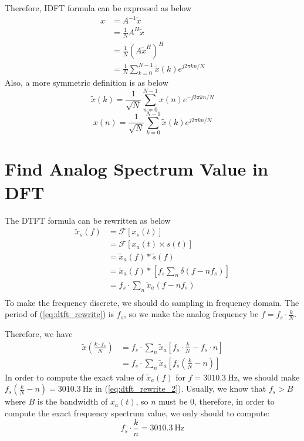 \documentclass{article}
\begin{document}
Therefore, IDFT formula can be expressed as below
\begin{equation}
    \begin{aligned}
        x &= A^{-1} \tilde{x}\\ 
        &= \frac1N A^H \tilde{x} \\ 
        &= \frac{1}{N} (A \tilde{x}^H)^H \\ 
        &= \frac{1}{N} \sum^{N - 1}_{k = 0} \tilde{x}(k)e^{j2\pi kn /N}
    \end{aligned}
\end{equation}
Also, a more symmetric definition is as below
$$
    \tilde{x}(k) = \frac{1}{\sqrt{N}} \sum_{n = 0}^{N - 1} x(n) e^{-j 2\pi kn/N}
$$
$$
    x(n) = \frac{1}{\sqrt{N}} \sum_{k = 0}^{N - 1} \tilde{x}(k) e^{j 2\pi kn/N}
$$
\section{Find Analog Spectrum Value in DFT}
The DTFT formula can be rewritten as below
\begin{equation}
\begin{aligned}
\tilde{x}_s(f) &= \mathcal{F} \left[ x_s(t) \right] \\ 
&= \mathcal{F} \left[ x_a(t) \times s(t) \right] \\ 
&= \tilde{x}_a(f) *\tilde{s}(f) \\ 
&= \tilde{x}_a(f) * \left[ f_s \sum_n \delta(f - nf_s) \right] \\
&=f_s \cdot \sum_n \tilde{x}_a(f - nf_s) \\
\end{aligned}
\label{eq:dtft_rewrite}
\end{equation}
To make the frequency discrete, we should do sampling in frequency domain. The period of (\ref{eq:dtft_rewrite}) is $f_s$, so we make the analog frequency be $f = f_s \cdot \frac k N$.

Therefore, we have
\begin{equation}
\begin{aligned}
\tilde{x}(\frac{k\cdot f_s}{N}) &= f_s \cdot \sum_n \tilde{x}_a[f_s \cdot \frac kN - f_s \cdot n] \\ 
&= f_s \cdot \sum_n \tilde{x}_a[f_s(\frac kN - n)]
\end{aligned}
\label{eq:dtft_rewrite_2}
\end{equation}
In order to compute the exact value of $\tilde{x}_a(f)$ for $f = 3010.3 ~\mathrm{Hz} $, we should make $f_s(\frac kN - n) = 3010.3 ~\mathrm{Hz}$ in (\ref{eq:dtft_rewrite_2}). Usually, we know that $f_s > B$ where $B$ is the bandwidth of $x_a(t)$, so $n$ must be $0$, therefore, in order to compute the exact frequency spectrum value, we only should to compute: 
$$
f_s\cdot \frac kn = 3010.3 ~\mathrm{Hz}
$$
\end{document}
